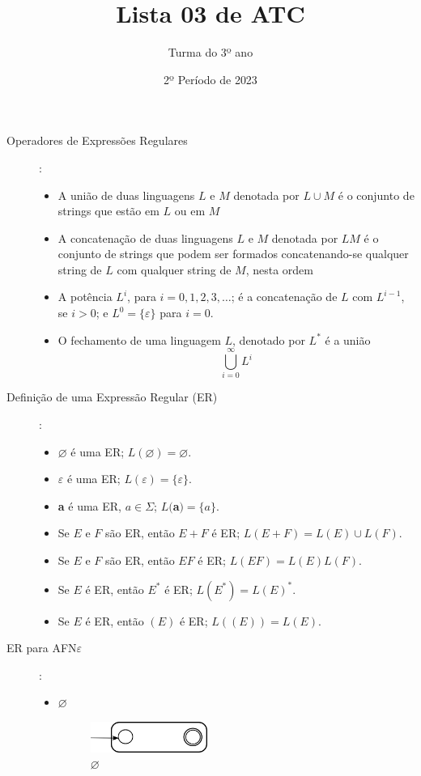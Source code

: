 \documentclass[12pt]{article}
\title{Lista 03 de ATC}
\date{2º Período de 2023}
\author{Turma do 3º ano}
\def\ve{\varepsilon}
\def\emptyset{\varnothing}
\begin{document}
 

\maketitle

\begin{description}

\item[Operadores de Expressões Regulares]:
\begin{itemize}
\item A união de duas linguagens $L$ e $M$ denotada por $L\cup M$ 
é o conjunto de strings que estão em $L$ ou em $M$
\item A concatenação de duas linguagens $L$ e $M$ denotada por $LM$
é o conjunto de strings que podem ser formados concatenando-se qualquer string de $L$ 
com qualquer string de $M$, 
nesta ordem
\item A potência $L^i$, para $i=0,1,2,3, \dots$; é a concatenação de $L$ com $L^{i-1}$, se $i>0$;
e $L^0 = \{\ve\}$ para $i=0$.
\item O fechamento de uma linguagem $L$, denotado por $L^*$ é a união
\[\bigcup_{i=0}^\infty L^i\]
\end{itemize}

\item[Definição de uma Expressão Regular (ER)]:

\begin{itemize}
\item $\emptyset$ é uma ER; $L(\emptyset) = \emptyset$.
\item $\ve$ é uma ER; $L(\ve) = \{\ve\}$.
\item \textbf{a} é uma ER, $a\in \Sigma$; $L($\textbf{a}$) = \{a\}$.
\item Se $E$ e $F$ são ER, então $E+F$ é ER; $L(E+F) = L(E)\cup L(F)$.
\item Se $E$ e $F$ são ER, então $EF$ é ER; $L(EF) = L(E)L(F)$.
\item Se $E$ é ER, então $E^*$ é ER; $L(E^*) = L(E)^*$.
\item Se $E$ é ER, então $(E)$ é ER; $L((E)) = L(E)$.
\end{itemize}

\break

\item[ER para AFN$\ve$]:
\begin{itemize}
\item $\emptyset$
\begin{figure}[H]
    \centering
    \includegraphics[width=0.4\textwidth]{ERtoAFNeEmpty}
    \caption{$\emptyset$}
    \label{fig:ERtoAFNeEmpty}
\end{figure}


\end{itemize}
\end{description}
\end{document}
